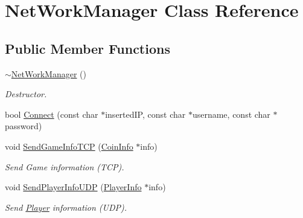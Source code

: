 \hypertarget{class_net_work_manager}{}\section{Net\+Work\+Manager Class Reference}
\label{class_net_work_manager}
\subsection*{Public Member Functions}
\begin{DoxyCompactItemize}
\item 
\mbox{\label{class_net_work_manager_a3af3630c2f0595dde7968a8343ef2518}} 
\hyperlink{class_net_work_manager_a3af3630c2f0595dde7968a8343ef2518}{$\sim$\+Net\+Work\+Manager} ()
\begin{DoxyCompactList}\small\item\em Destructor. \end{DoxyCompactList}\item 
bool \hyperlink{class_net_work_manager_ae6aebea892bd72e57ce9e796d7068114}{Connect} (const char $\ast$inserted\+IP, const char $\ast$username, const char $\ast$password)
\item 
\mbox{\label{class_net_work_manager_af2f7b5173c1beeab56e115f48b7363bf}} 
void \hyperlink{class_net_work_manager_af2f7b5173c1beeab56e115f48b7363bf}{Send\+Game\+Info\+T\+CP} (\hyperlink{struct_coin_info}{Coin\+Info} $\ast$info)
\begin{DoxyCompactList}\small\item\em Send Game information (T\+CP). \end{DoxyCompactList}\item 
\mbox{\label{class_net_work_manager_add871151fce653f873aff9ee3f79844e}} 
void \hyperlink{class_net_work_manager_add871151fce653f873aff9ee3f79844e}{Send\+Player\+Info\+U\+DP} (\hyperlink{struct_player_info}{Player\+Info} $\ast$info)
\begin{DoxyCompactList}\small\item\em Send \hyperlink{class_player}{Player} information (U\+DP). \end{DoxyCompactList}\item 
\mbox{\label{class_net_work_manager_a8c5f0058427dffc0a83d2638e1047243}} 

\end{DoxyCompactItemize}
